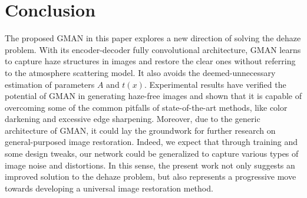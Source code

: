 \documentclass[journal]{IEEEtran}
\begin{document}




\section{Conclusion}
The proposed GMAN in this paper explores a new direction of solving the dehaze problem. With its encoder-decoder fully convolutional architecture, GMAN learns to capture haze structures in images and restore the clear ones without referring to the atmosphere scattering model. It also avoids the deemed-unnecessary estimation of parameters $A$ and $t(x)$. Experimental results have verified the potential of GMAN in generating haze-free images and shown that it is capable of overcoming some of the common pitfalls of state-of-the-art  methods, like color darkening and excessive edge sharpening. Moreover, due to the generic architecture of GMAN, it could lay the groundwork for further research on general-purposed image restoration. Indeed, we expect that through training and some design tweaks, our network could be generalized to capture various types of image noise and distortions. In this sense, the present work not only suggests an improved solution to the dehaze problem, but also represents a progressive move towards developing a universal image restoration method.






%
\end{document}
